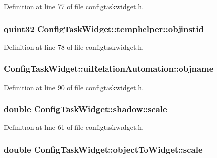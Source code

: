 \-Definition at line 77 of file configtaskwidget.\-h.

\hypertarget{group___u_a_v_object_widget_utils_ga80a5419befd7432330b2ffb95368f4ed}{
\subsubsection[{objinstid}]{\setlength{\rightskip}{0pt plus 5cm}quint32 {\bf \-Config\-Task\-Widget\-::temphelper\-::objinstid}}}\label{group___u_a_v_object_widget_utils_ga80a5419befd7432330b2ffb95368f4ed}


\-Definition at line 78 of file configtaskwidget.\-h.

\hypertarget{group___u_a_v_object_widget_utils_ga3a6899c9cfb56d74f0bf98300a156bc7}{
\subsubsection[{objname}]{ {\bf \-Config\-Task\-Widget\-::ui\-Relation\-Automation\-::objname}}}\label{group___u_a_v_object_widget_utils_ga3a6899c9cfb56d74f0bf98300a156bc7}


\-Definition at line 90 of file configtaskwidget.\-h.

\hypertarget{group___u_a_v_object_widget_utils_ga06ad87fdaa5af70d7239dda785c76f76}{
\subsubsection[{scale}]{\setlength{\rightskip}{0pt plus 5cm}double {\bf \-Config\-Task\-Widget\-::shadow\-::scale}}}\label{group___u_a_v_object_widget_utils_ga06ad87fdaa5af70d7239dda785c76f76}


\-Definition at line 61 of file configtaskwidget.\-h.

\hypertarget{group___u_a_v_object_widget_utils_ga7981e8bb575a90d2a1491fd792108efe}{
\subsubsection[{scale}]{\setlength{\rightskip}{0pt plus 5cm}double {\bf \-Config\-Task\-Widget\-::object\-To\-Widget\-::scale}}}\label{group___u_a_v_object_widget_utils_ga7981e8bb575a90d2a1491fd792108efe}


